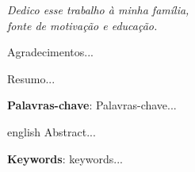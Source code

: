 \documentclass[
    12pt,               %
    openright,          %
    oneside,
    a4paper,            %
    english,            %
    french,             %
    spanish,            %
    brazil              %
    ]{abntex2}
\begin{document}
%

\begin{dedicatoria}
   \vspace*{\fill}
   \centering
   \noindent
   \textit{ Dedico esse trabalho à minha família, \\ fonte de motivação e educação.} \vspace*{\fill}
\end{dedicatoria}

\begin{agradecimentos}
Agradecimentos...

\end{agradecimentos}



\setlength{\absparsep}{18pt} %
\begin{resumo}
Resumo...

\textbf{Palavras-chave}: Palavras-chave...
\end{resumo}

\begin{resumo}[Abstract]
 \begin{otherlanguage*}{english}
    Abstract...

   \vspace{\onelineskip}
 
   \noindent 
   \textbf{Keywords}: keywords...
 \end{otherlanguage*}
\end{resumo}

\listoffigures*
\cleardoublepage

\listoftables*
\cleardoublepage
\end{document}
